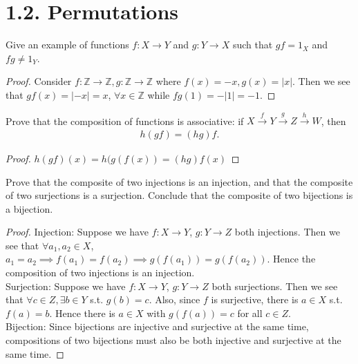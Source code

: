 \documentclass[12pt]{article}
\newenvironment{exercise}[2][Exercise]{\begin{trivlist}
\item[\hskip \labelsep {\bfseries #1}\hskip \labelsep {\bfseries #2.}]}
{\end{trivlist}}
\begin{document}
\section*{1.2.  Permutations}

 \begin{exercise}{1.5}

 Give an example of functions $f: X\rightarrow Y$ and $g: Y\rightarrow X$ such that $gf = 1_{X}$ and $fg \neq 1_Y$.
 \end{exercise} 

 \begin{proof}
    Consider $f:\mathbb{Z}\rightarrow\mathbb{Z}, g:\mathbb{Z}\rightarrow\mathbb{Z}$ where $f(x) = -x, g(x) = |x|$. Then we see that ${gf(x)=|-x|=x}$,  $\forall x\in \mathbb{Z}$ while ${fg(1)=-|1|=-1}$.
 \end{proof}



 \begin{exercise}{1.6}

Prove that the composition of functions is associative: if $X\xrightarrow{f}Y\xrightarrow{g}Z\xrightarrow{h}W$, then \begin{align*}h(gf)=(hg)f.\end{align*}
 \end{exercise}
\begin{proof}
     $h(gf) (x) = h(g(f(x)) = (hg)f(x)$ 
\end{proof}





\begin{exercise}{1.7}

Prove that the composite of two injections is an injection, and that the composite of two surjections is a surjection. Conclude that the composite of two bijections is a bijection.
\end{exercise}

\begin{proof}
    Injection: Suppose we have $f:X\rightarrow Y$, $g:Y\rightarrow Z$ both injections. Then we see that $\forall a_1,a_2\in X$, $a_1=a_2 \implies f(a_1)=f(a_2) \implies g(f(a_1)) = g(f(a_2))$. Hence the composition of two injections is an injection.\\
    Surjection: Suppose we have $f:X\rightarrow Y$, $g:Y\rightarrow Z$ both surjections. Then we see that $\forall c \in Z, \exists b \in Y$ s.t. $g(b)=c$. Also, since $f$ is surjective, there is $a\in X$ s.t. $f(a)=b$. Hence there is $a\in X$ with $g(f(a)) = c$ for all $c\in Z$.\\
    Bijection: Since bijections are injective and surjective at the same time, compositions of two bijections must also be both injective and surjective at the same time.
\end{proof}
\end{document}
